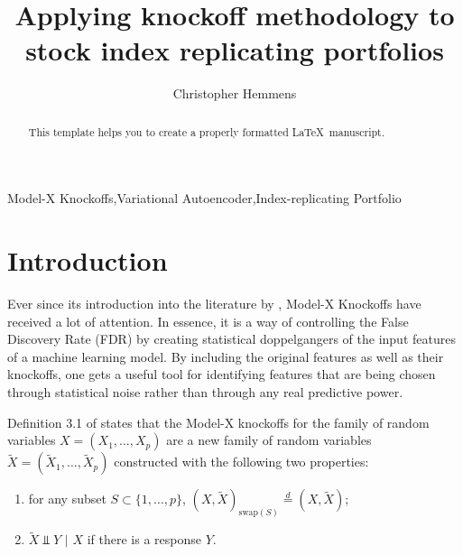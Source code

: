 \documentclass[review]{elsarticle}
\begin{document}
\begin{frontmatter}

\title{Applying knockoff methodology to stock index replicating portfolios}

\author{Christopher Hemmens}
\address{HEIG-VD, Rue de Galilée 15, 1400 Yverdon-les-Bains, Switzerland}




\begin{abstract}
This template helps you to create a properly formatted \LaTeX\ manuscript.
\end{abstract}

\begin{keyword}
Model-X Knockoffs\sep Variational Autoencoder\sep Index-replicating Portfolio
\end{keyword}

\end{frontmatter}


\section{Introduction}

Ever since its introduction into the literature by \citet{candes2018panning}, Model-X Knockoffs have received a lot of attention. In essence, it is a way of controlling the False Discovery Rate (FDR) by creating statistical doppelgangers of the input features of a machine learning model. By including the original features as well as their knockoffs, one gets a useful tool for identifying features that are being chosen through statistical noise rather than through any real predictive power.

Definition 3.1 of \citet{candes2018panning} states that the Model-X knockoffs for the family of random variables $X=(X_1,\dots,X_p)$ are a new family of random variables $\tilde{X}=(\tilde{X}_1,\dots,\tilde{X}_p)$ constructed with the following two properties:
\begin{enumerate}
\item for any subset $S\subset\{1,\dots,p\}$, $(X,\tilde{X})_{\text{swap}(S)}\stackrel{d}{=}(X,\tilde{X})$;
\item $\tilde{X}\Perp Y$ $|$ $X$ if there is a response $Y$.
\end{enumerate}
\end{document}
